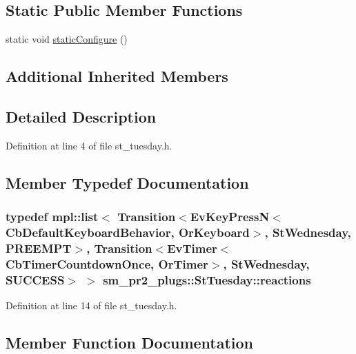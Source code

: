 \subsection*{Static Public Member Functions}
\begin{DoxyCompactItemize}
\item 
static void \hyperlink{structsm__pr2__plugs_1_1StTuesday_ab858937bbb2a87563d19729c90ecf324}{static\+Configure} ()
\end{DoxyCompactItemize}
\subsection*{Additional Inherited Members}


\subsection{Detailed Description}


Definition at line 4 of file st\+\_\+tuesday.\+h.



\subsection{Member Typedef Documentation}
\subsubsection[{\texorpdfstring{reactions}{reactions}}]{\setlength{\rightskip}{0pt plus 5cm}typedef mpl\+::list$<$ Transition$<$Ev\+Key\+PressN$<$Cb\+Default\+Keyboard\+Behavior, {\bf Or\+Keyboard}$>$, {\bf St\+Wednesday}, {\bf P\+R\+E\+E\+M\+PT}$>$, Transition$<$Ev\+Timer$<$Cb\+Timer\+Countdown\+Once, {\bf Or\+Timer}$>$, {\bf St\+Wednesday}, {\bf S\+U\+C\+C\+E\+SS}$>$ $>$ {\bf sm\+\_\+pr2\+\_\+plugs\+::\+St\+Tuesday\+::reactions}}\hypertarget{structsm__pr2__plugs_1_1StTuesday_a3ee46b54b411275e6c623068895e7e1a}{}\label{structsm__pr2__plugs_1_1StTuesday_a3ee46b54b411275e6c623068895e7e1a}


Definition at line 14 of file st\+\_\+tuesday.\+h.



\subsection{Member Function Documentation}
